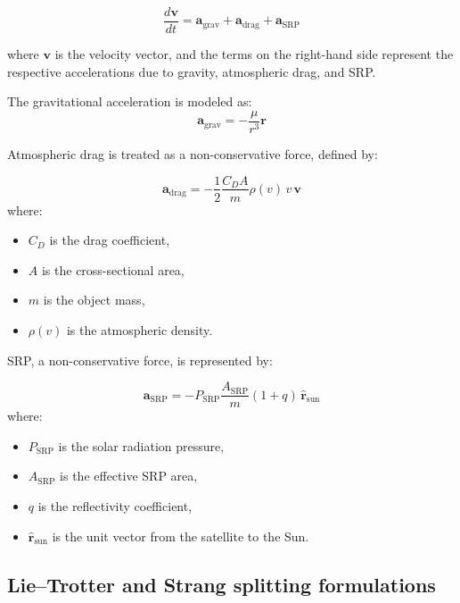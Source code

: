 \documentclass[letterpaper, paper,11pt]{AAS}
\begin{document}
\begin{equation}
    \frac{d\bm{v}}{dt} = \bm{a}_{\text{grav}} + \bm{a}_{\text{drag}} + \bm{a}_{\text{SRP}}
\end{equation}

where $\bm{v}$ is the velocity vector, and the terms on the right-hand side represent the respective accelerations due to gravity, atmospheric drag, and SRP.

The gravitational acceleration is modeled as:
\begin{equation}
    \bm{a}_{\text{grav}} = -\frac{\mu}{r^3} \bm{r}
\end{equation}

Atmospheric drag is treated as a non-conservative force, defined by:

\begin{equation}
    \bm{a}_{\text{drag}} = -\frac{1}{2} \frac{C_D A}{m} \rho(v) \, v \, \bm{v}
\end{equation}
where:
\begin{itemize}
    \item $C_D$ is the drag coefficient,
    \item $A$ is the cross-sectional area,
    \item $m$ is the object mass,
    \item $\rho(v)$ is the atmospheric density.
\end{itemize}

SRP, a non-conservative force, is represented by:

\begin{equation}
    \bm{a}_{\text{SRP}} = -P_{\text{SRP}} \frac{A_{\text{SRP}}}{m} (1 + q) \, \hat{\bm{r}}_{\text{sun}}
\end{equation}
where:
\begin{itemize}
    \item $P_{\text{SRP}}$ is the solar radiation pressure,
    \item $A_{\text{SRP}}$ is the effective SRP area,
    \item $q$ is the reflectivity coefficient,
    \item $\hat{\bm{r}}_{\text{sun}}$ is the unit vector from the satellite to the Sun.
\end{itemize}

\subsection{Lie–Trotter and Strang splitting formulations}
\end{document}
